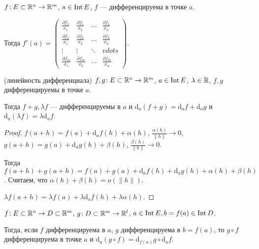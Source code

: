 \begin{consequence}
    $f\!: E \subset \mathbb{R}^n \to \mathbb{R}^m$,  $a \in \operatorname{Int} E$,  $f$ --- дифференцируема в точке  $a$.

    Тогда  $f'(a) = 
    \begin{pmatrix} 
    \frac{\partial f_1}{x_1} & \frac{\partial f_1}{x_2} & \ldots & \frac{\partial f_1}{x_n}\\
    \frac{\partial f_2}{x_1} &\frac{\partial f_2}{x_2} & \ldots &\frac{\partial f_2}{x_n}\\ 
    \vdots & \vdots & \ddots & vdots\\ 
    \frac{\partial f_m}{x_1} & \frac{\partial f_m}{x_2} & \ldots & \frac{\partial f_m}{x_n} 
    \end{pmatrix}$.
\end{consequence}
\begin{theorem}(линейность дифференциала)
    $f, g\!: E \subset \mathbb{R}^n \to \mathbb{R}^m$,  $a \in \operatorname{Int} E$,  $\lambda \in \mathbb{R}$, $f, g$ дифференцируемы в точке $a$.

    Тогда $f + g, \lambda f$ --- дифференцируемы в  $a$ и $\mathrm{d}_a(f+g) = \mathrm{d}_af + \mathrm{d}_ag $ и $\mathrm{d}_a(\lambda f) = \lambda \mathrm{d}_a f$.
\end{theorem}
\begin{proof}
    $f(a+h) = f(a) + \mathrm{d}_af(h) + \alpha(h)$, $\frac{\alpha(h)}{\|h\|} \to 0$, $g(a + h) = g(a) + \mathrm{d}_ag(h) + \beta(h)$, $\frac{\beta(h)}{\|h\|} \to 0$.

    Тогда $f(a+h) + g(a+h) = f(a) + g(a) + \mathrm{d}_af(h) + \mathrm{d}_ag(h) + \alpha(h) + \beta(h)$. Считаем, что  $\alpha(h) + \beta(h) = o(\|h\|)$.

     $\lambda f(a+h) = \lambda f(a) + \lambda \mathrm{d_a}f(h) + \lambda\alpha(h)$.
\end{proof}
\begin{theorem}
    $f\!: E \subset \mathbb{R}^n \to D \subset \mathbb{R}^m$, $g\!: D \subset \mathbb{R}^m \to \mathbb{R}^l$,  $a \in \operatorname{Int} E, b = f(a) \in \operatorname{Int} D$.

    Тогда, если  $f$ дифференцируема в  $a$,  $g$ дифференцируема в  $b = f(a)$, то  $g \circ f$ дифференцируема в точке  $a$ и  $\mathrm{d}_a(g \circ f) = \mathrm{d}_{f(a)}g \circ \mathrm{d}_af$.
\end{theorem}
